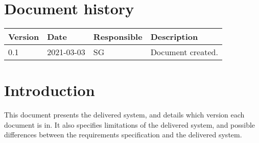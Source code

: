 \documentclass{article}
\date {#1}
\title {
    \documentNumber {01}    
    
    \documentVersion {0.1}
    
    \documentTitle {Template}
    \documentGroup {2}
    
    \documentResponsible {System Group}
    \documentAuthors {System group}
    
    \documentDate {2021-03-03}
}
\begin{document}
\maketitle
\thispagestyle{empty}

\newpage

\tableofcontents

\newpage



\section{Document history}

\begin{tabular}{ l | l | l | l }
    Version & Date & Responsible & Description \\
    \hline
    0.1 & 2021-03-03 & SG & Document created. \\
   
\end{tabular}

\section{Introduction}
    This document presents the delivered system, and details which version each document is in. It also specifies limitations of the delivered system, and possible differences between the requirements specification and the delivered system.
\end{document}
